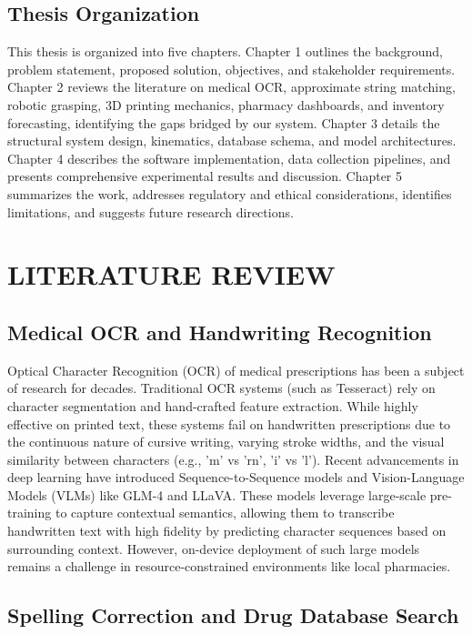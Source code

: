 \documentclass[12pt,a4paper,oneside]{report}
\begin{document}
\section{Thesis Organization}\label{thesis-organization}

This thesis is organized into five chapters. Chapter 1 outlines the
background, problem statement, proposed solution, objectives, and
stakeholder requirements. Chapter 2 reviews the literature on medical
OCR, approximate string matching, robotic grasping, 3D printing
mechanics, pharmacy dashboards, and inventory forecasting, identifying
the gaps bridged by our system. Chapter 3 details the structural system
design, kinematics, database schema, and model architectures. Chapter 4
describes the software implementation, data collection pipelines, and
presents comprehensive experimental results and discussion. Chapter 5
summarizes the work, addresses regulatory and ethical considerations,
identifies limitations, and suggests future research directions.

\chapter{LITERATURE REVIEW}\label{literature-review}

\section{Medical OCR and Handwriting
Recognition}\label{medical-ocr-and-handwriting-recognition}

Optical Character Recognition (OCR) of medical prescriptions has been a
subject of research for decades. Traditional OCR systems (such as
Tesseract) rely on character segmentation and hand-crafted feature
extraction. While highly effective on printed text, these systems fail
on handwritten prescriptions due to the continuous nature of cursive
writing, varying stroke widths, and the visual similarity between
characters (e.g., 'm' vs 'rn', 'i' vs 'l'). Recent advancements in deep
learning have introduced Sequence-to-Sequence models and Vision-Language
Models (VLMs) like GLM-4 and LLaVA. These models leverage large-scale
pre-training to capture contextual semantics, allowing them to
transcribe handwritten text with high fidelity by predicting character
sequences based on surrounding context. However, on-device deployment of
such large models remains a challenge in resource-constrained
environments like local pharmacies.

\section{Spelling Correction and Drug Database
Search}\label{spelling-correction-and-drug-database-search}
\end{document}
